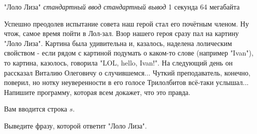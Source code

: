 \begin{problem}%
{"Лоло Лиза"}%
{\textsl{стандартный ввод}}%
{\textsl{стандартный вывод}}%
{1 секунда}%
{64 мегабайта}{}

Успешно преодолев испытание совета наш герой стал его почётным членом. Ну чтож, самое время пойти в Лол-зал. Взор нашего героя сразу пал на картину "Лоло Лиза". Картина была удивительна и, казалось, наделена лолическим свойством - если рядом с картиной подумать о каком-то слове (например "Ivan"), то картина, казолось, говорила "LOL, hello, Ivan!". На следующий день он рассказал Виталию Олеговичу о случившемся... Чуткий преподаватель, конечно, поверил, но нотку неуверенности в его голосе Трилолбитов всё-таки услышал... Напишите программу, которая всем докажет, что это правда.

\InputFile

Вам вводится строка $s$.

\OutputFile

Выведите фразу, которой ответит "Лоло Лиза".

\Examples

\begin{example}
%
\end{example}
\end{problem}
